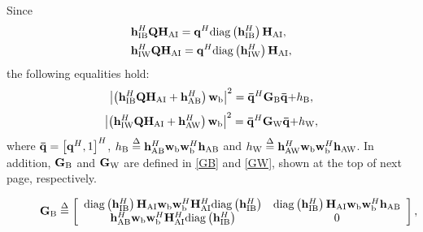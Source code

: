 \documentclass[10pt,journal,letterpaper,twocolumn,twoside]{IEEEtran} %
\begin{document}
Since
   \begin{subequations}\label{C_16}
\begin{align}
&{\bf{h}}_{{\rm{IB}}}^H{\bf{Q}}{{\bf{H}}_{{\rm{AI}}}} = {{\bf{q}}^H}{\rm{diag}}\left( {{\bf{h}}_{{\rm{IB}}}^H} \right){{\bf{H}}_{{\rm{AI}}}},\\
&{\bf{h}}_{{\rm{IW}}}^H{\bf{Q}}{{\bf{H}}_{{\rm{AI}}}} = {{\bf{q}}^H}{\rm{diag}}\left( {{\bf{h}}_{{\rm{IW}}}^H} \right){{\bf{H}}_{{\rm{AI}}}},
 \end{align}
\end{subequations}
the following equalities hold:
\begin{align}\label{C_17}
{\left| {\left( {{\bf{h}}_{{\rm{IB}}}^H{\bf{Q}}{{\bf{H}}_{{\rm{AI}}}} + {\bf{h}}_{{\rm{AB}}}^H} \right){{\bf{w}}_{\rm{b}}}} \right|^2}={{{\bf{\bar q}}}^H}{{\bf{G}}_{\rm{B}}}{\bf{\bar q}}{\rm{ + }}{h_{\rm{B}}},
 \end{align}
 \begin{align}\label{C_18}
{\left| {\left( {{\bf{h}}_{{\rm{IW}}}^H{\bf{Q}}{{\bf{H}}_{{\rm{AI}}}} + {\bf{h}}_{{\rm{AW}}}^H} \right){{\bf{w}}_{\rm{b}}}} \right|^{\rm{2}}} = {{{\bf{\bar q}}}^H}{{\bf{G}}_{\rm{W}}}{\bf{\bar q}}{\rm{ + }}{h_{\rm{W}}},
 \end{align}
 where ${\bf{\bar q}} = {\left[ {{{\bf{q}}^H},1} \right]^H}$, ${h_{\rm{B}}} \buildrel \Delta \over = {\bf{h}}_{{\rm{AB}}}^H{{\bf{w}}_{\rm{b}}}{\bf{w}}_{\rm{b}}^H{{\bf{h}}_{{\rm{AB}}}}$ and ${h_{\rm{W}}} \buildrel \Delta \over ={\bf{h}}_{{\rm{AW}}}^H{{\bf{w}}_{\rm{b}}}{\bf{w}}_{\rm{b}}^H{{\bf{h}}_{{\rm{AW}}}}$. In addition, ${{\bf{G}}_{\rm{B}}} $ and ${{\bf{G}}_{\rm{W}}} $ are defined in \eqref{GB} and \eqref{GW}, shown at the top of next page, respectively.
 \begin{figure*}[pt]
 \begin{align}\label{GB}
{{\bf{G}}_{\rm{B}}}  \buildrel \Delta \over =  \left[ {\begin{array}{*{20}{c}}
{{\rm{diag}}\left( {{\bf{h}}_{{\rm{IB}}}^H} \right){{\bf{H}}_{{\rm{AI}}}}{{\bf{w}}_{\rm{b}}}{\bf{w}}_{\rm{b}}^H{\bf{H}}_{{\rm{AI}}}^H{\rm{diag}}\left( {{\bf{h}}_{{\rm{IB}}}^H} \right)}&{{\rm{diag}}\left( {{\bf{h}}_{{\rm{IB}}}^H} \right){{\bf{H}}_{{\rm{AI}}}}{{\bf{w}}_{\rm{b}}}{\bf{w}}_{\rm{b}}^H{{\bf{h}}_{{\rm{AB}}}}}\\
{{\bf{h}}_{{\rm{AB}}}^H{{\bf{w}}_{\rm{b}}}{\bf{w}}_{\rm{b}}^H{\bf{H}}_{{\rm{AI}}}^H{\rm{diag}}\left( {{\bf{h}}_{{\rm{IB}}}^H} \right)}&0
\end{array}} \right],
 \end{align}
 \end{figure*}
\end{document}
